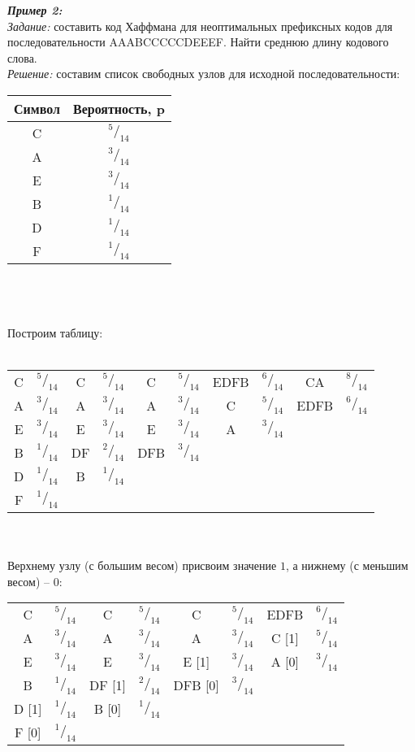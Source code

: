 \emph{\textbf{Пример 2:}}
\\\emph{Задание:} составить код Хаффмана для неоптимальных префиксных кодов для последовательности AAABCCCCCDEEEF. Найти среднюю длину кодового слова.
\\\emph{Решение:} составим список свободных узлов для исходной последовательности:
\\
\begin{minipage}[h]{\textwidth}
\begin{tabular}{|c|c|}
\hline
Символ &  Вероятность, p \\
\hline
C & $^5/_{14}$ \\
A & $^3/_{14}$ \\
E & $^3/_{14}$ \\
B & $^1/_{14}$ \\
D & $^1/_{14}$ \\
F & $^1/_{14}$ \\
\hline
\end{tabular}
\end{minipage}
\\ \\
\\Построим таблицу:
\\
\\\begin{minipage}[h]{\textwidth}
\begin{tabular}{|c|c||c|c||c|c||c|c||c|c|}
\hline
C & $^5/_{14}$ & C & $^5/_{14}$ & C & $^5/_{14}$ & EDFB & $^6/_{14}$ & CA & $^8/_{14}$ \\
A & $^3/_{14}$ & A & $^3/_{14}$ & A & $^3/_{14}$ & C & $^5/_{14}$ & EDFB & $^6/_{14}$ \\
E & $^3/_{14}$ & E & $^3/_{14}$ & E & $^3/_{14}$ & A & $^3/_{14}$ & & \\
B & $^1/_{14}$ & DF & $^2/_{14}$ & DFB & $^3/_{14}$ & & & &\\
D & $^1/_{14}$ & B & $^1/_{14}$ & & & & & &\\
F & $^1/_{14}$ & & & & & & & &\\
\hline
\end{tabular}
\end{minipage}
\\
\\Верхнему узлу (с большим весом) присвоим значение $1$, а нижнему (с меньшим весом) -- $0$:
\begin{table}[h]
\begin{tabular}{|c|c||c|c||c|c||c|c|}
\hline
C & $^5/_{14}$ & C & $^5/_{14}$ & C & $^5/_{14}$ & EDFB & $^6/_{14}$   \\
A & $^3/_{14}$ & A & $^3/_{14}$ & A & $^3/_{14}$ & C [1] & $^5/_{14}$   \\
E & $^3/_{14}$ & E & $^3/_{14}$ & E [1] & $^3/_{14}$ & A [0] & $^3/_{14}$  \\
B & $^1/_{14}$ & DF [1] & $^2/_{14}$ & DFB [0] & $^3/_{14}$ & & \\
D [1] & $^1/_{14}$ & B [0] & $^1/_{14}$ & & & & \\
F [0] & $^1/_{14}$ & & & & & & \\
\hline
\end{tabular}
\end{table}
